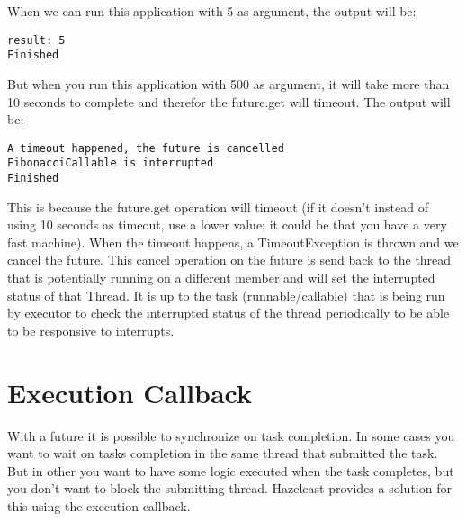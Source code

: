 When we can run this application with 5 as argument, the output will be: 
\begin{lstlisting}
result: 5
Finished
\end{lstlisting}
But when you run this application with 500 as argument, it will take more than 10 seconds to complete and therefor the future.get will timeout. The output will be:
\begin{lstlisting}
A timeout happened, the future is cancelled
FibonacciCallable is interrupted
Finished
\end{lstlisting}
This is because the future.get operation will timeout (if it doesn't instead of using 10 seconds as timeout, use a lower value; it could be that you have a very fast machine). When the timeout happens, a TimeoutException is thrown and we cancel the future. This cancel operation on the future is send back to the thread that is potentially running on a different member and will set the interrupted status of that Thread. It is up to the task (runnable/callable) that is being run by executor to check the interrupted status of the thread periodically to be able to be responsive to interrupts.

\section{Execution Callback}
With a future it is possible to synchronize on task completion. In some cases you want to wait on tasks completion in the same thread that submitted the task. But in other you want to have some logic executed when the task completes, but you don't want to block the submitting thread. Hazelcast provides a solution for this using the execution callback.

